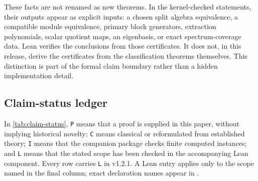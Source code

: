 \documentclass[11pt]{article}
\theoremstyle{definition}
\theoremstyle{remark}
\begin{document}
These facts are not renamed as new theorems. In the kernel-checked statements, their outputs appear as explicit inputs: a chosen split algebra equivalence, a compatible module equivalence, primary block generators, extraction polynomials, scalar quotient maps, an eigenbasis, or exact spectrum-coverage data. Lean verifies the conclusions from those certificates. It does not, in this release, derive the certificates from the classification theorems themselves. This distinction is part of the formal claim boundary rather than a hidden implementation detail.

\subsection{Claim-status ledger}

In \cref{tab:claim-status}, \texttt{P} means that a proof is supplied in this paper, without implying historical novelty; \texttt{C} means classical or reformulated from established theory; \texttt{I} means that the companion package checks finite computed instances; and \texttt{L} means that the stated scope has been checked in the accompanying Lean component. Every row carries \texttt{L} in v1.2.1. A Lean entry applies only to the scope named in the final column; exact declaration names appear in .
\end{document}
